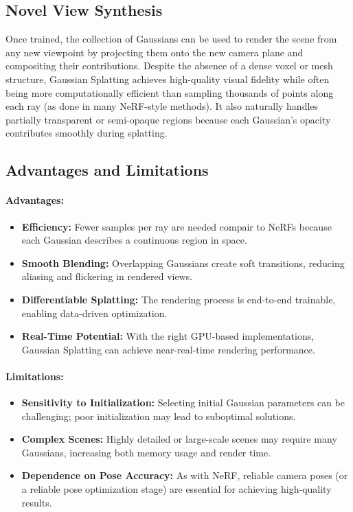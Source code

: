 \subsection{Novel View Synthesis}
Once trained, the collection of Gaussians can be used to render the scene from any new viewpoint by projecting them onto the new camera plane and compositing their contributions.
Despite the absence of a dense voxel or mesh structure, Gaussian Splatting achieves high-quality visual fidelity while often being more computationally efficient than sampling thousands of points along each ray (as done in many NeRF-style methods).
It also naturally handles partially transparent or semi-opaque regions because each Gaussian's opacity contributes smoothly during splatting.

\subsection{Advantages and Limitations}
\paragraph{Advantages:}
\begin{itemize}
    \item \textbf{Efficiency:} Fewer samples per ray are needed compair to NeRFs because each Gaussian describes a continuous region in space.
    \item \textbf{Smooth Blending:} Overlapping Gaussians create soft transitions, reducing aliasing and flickering in rendered views.
    \item \textbf{Differentiable Splatting:} The rendering process is end-to-end trainable, enabling data-driven optimization.
    \item \textbf{Real-Time Potential:} With the right GPU-based implementations, Gaussian Splatting can achieve near-real-time rendering performance.
\end{itemize}

\paragraph{Limitations:}
\begin{itemize}
    \item \textbf{Sensitivity to Initialization:} Selecting initial Gaussian parameters can be challenging; poor initialization may lead to suboptimal solutions.
    \item \textbf{Complex Scenes:} Highly detailed or large-scale scenes may require many Gaussians, increasing both memory usage and render time.
    \item \textbf{Dependence on Pose Accuracy:} As with NeRF, reliable camera poses (or a reliable pose optimization stage) are essential for achieving high-quality results.
\end{itemize}

